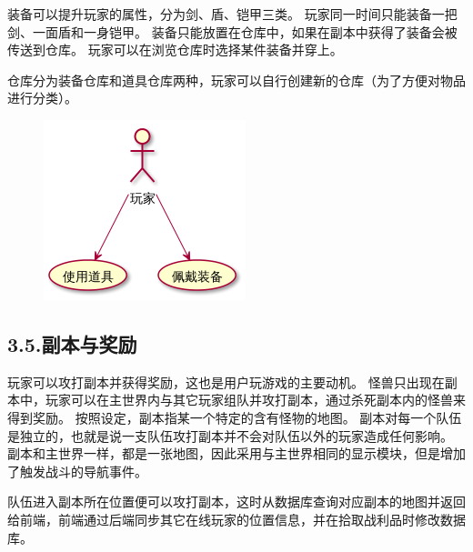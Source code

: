 \documentclass{article}
\begin{document}
装备可以提升玩家的属性，分为剑、盾、铠甲三类。 玩家同一时间只能装备一把剑、一面盾和一身铠甲。 装备只能放置在仓库中，如果在副本中获得了装备会被传送到仓库。 玩家可以在浏览仓库时选择某件装备并穿上。%

仓库分为装备仓库和道具仓库两种，玩家可以自行创建新的仓库（为了方便对物品进行分类）。%

\begin{figure}[tbp]%
\begin{mdcenter}%

\noindent{}\includegraphics[keepaspectratio=true]{./img/4}{}%

\mdhr{}%

\noindent{}%
\end{mdcenter}%
\end{figure}%

\subsection{3.5.\hspace*{0.5em}副本与奖励}\label{35}%

\noindent{}玩家可以攻打副本并获得奖励，这也是用户玩游戏的主要动机。 怪兽只出现在副本中，玩家可以在主世界内与其它玩家组队并攻打副本，通过杀死副本内的怪兽来得到奖励。 按照设定，副本指某一个特定的含有怪物的地图。 副本对每一个队伍是独立的，也就是说一支队伍攻打副本并不会对队伍以外的玩家造成任何影响。 副本和主世界一样，都是一张地图，因此采用与主世界相同的显示模块，但是增加了触发战斗的导航事件。%

队伍进入副本所在位置便可以攻打副本，这时从数据库查询对应副本的地图并返回给前端，前端通过后端同步其它在线玩家的位置信息，并在拾取战利品时修改数据库。%
\end{document}
